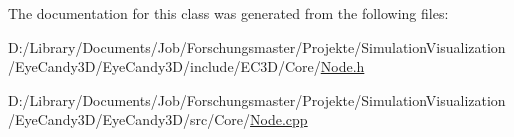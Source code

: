 The documentation for this class was generated from the following files\+:\begin{DoxyCompactItemize}
\item 
D\+:/\+Library/\+Documents/\+Job/\+Forschungsmaster/\+Projekte/\+Simulation\+Visualization/\+Eye\+Candy3\+D/\+Eye\+Candy3\+D/include/\+E\+C3\+D/\+Core/\mbox{\hyperlink{_node_8h}{Node.\+h}}\item 
D\+:/\+Library/\+Documents/\+Job/\+Forschungsmaster/\+Projekte/\+Simulation\+Visualization/\+Eye\+Candy3\+D/\+Eye\+Candy3\+D/src/\+Core/\mbox{\hyperlink{_node_8cpp}{Node.\+cpp}}\end{DoxyCompactItemize}

